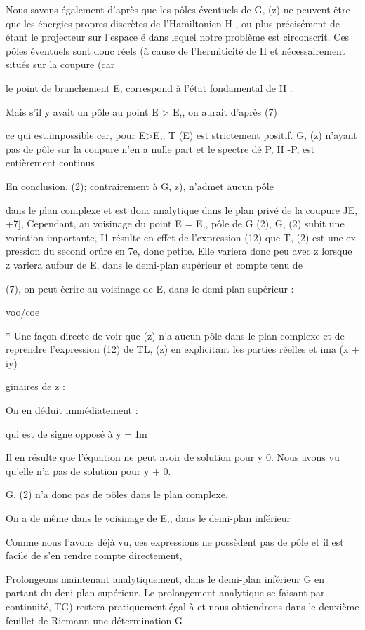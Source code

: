 Nous savons également d'après que les pôles éventuels de
G, (z) ne peuvent être que les énergies propres discrètes de l'Hamiltonien H ,
ou plus précisément de  étant le projecteur sur l'espace ë
dans lequel notre problème est circonscrit. Ces pôles éventuels sont donc réels
(à cause de l'hermiticité de H et nécessairement situés sur la coupure (car

le point de branchement E, correspond à l'état fondamental de H .


Mais s'il y avait un pôle au point E > E,, on aurait d'après (7)

ce qui est.impossible cer, pour E>E,; T (E) est strictement positif.
G, (z) n'ayant pas de pôle sur la coupure n'en a nulle part et le spectre
dé P, H -P, est entièrement continus

En conclusion, (2); contrairement à G, z), n'admet aucun pôle

dans le plan complexe et est donc analytique dans le plan privé de la coupure
JE, +7],
Cependant, au voisinage du point E = E,, pôle de G (2), G, (2)
subit une variation importante,
I1 résulte en effet de l'expression (12) que T, (2) est une ex
pression du second orûre en 7e, donc petite. Elle variera donc peu avec z
lorsque z variera aufour de E, dans le demi-plan supérieur et compte tenu de

(7), on peut écrire au voisinage de E, dans le demi-plan supérieur :

voo/coe



* Une façon directe de voir que (z) n'a aucun pôle dans le plan complexe et de
reprendre l'expression (12) de TL, (z) en explicitant les parties réelles et ima
(x + iy) 

ginaires de z : 


On en déduit immédiatement :

 qui est de signe opposé à y = Im 

Il en résulte que l'équation  ne peut avoir
de solution pour y  0. Nous avons vu qu'elle n'a pas de solution pour y + 0.

G, (2) n'a donc pas de pôles dans le plan complexe.

On a de même dans le voisinage de E,, dans le demi-plan inférieur

Comme nous l'avons déjà vu, ces expressions ne possèdent pas de
pôle et il est facile de s'en rendre compte directement,

Prolongeons maintenant analytiquement, dans le demi-plan inférieur G en partant du deni-plan supérieur. Le prolongement analytique se
faisant par continuité, TG) restera pratiquement égal à  et nous
obtiendrons dans le deuxième feuillet de Riemann une détermination G

